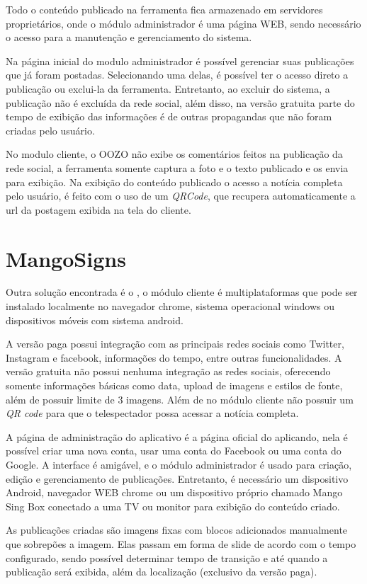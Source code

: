 Todo o conteúdo publicado na ferramenta fica armazenado em servidores proprietários, onde o módulo administrador é uma página WEB, sendo necessário o acesso para a manutenção e gerenciamento do sistema. 

Na página inicial do modulo administrador é possível gerenciar suas publicações que já foram postadas. Selecionando uma delas, é possível ter o acesso direto a publicação ou exclui-la da ferramenta. Entretanto, ao excluir do sistema, a publicação não é excluída da rede social, além disso, na versão gratuita parte do tempo de exibição das informações é de outras propagandas que não foram criadas pelo usuário. 

No modulo cliente, o OOZO não exibe os comentários feitos na publicação da rede social, a ferramenta somente captura a foto e o texto publicado e os envia para exibição. Na exibição do conteúdo publicado o acesso a notícia completa pelo usuário, é feito com o uso de um \textit{QRCode}, que recupera automaticamente a url da postagem exibida na tela do cliente.

\section{MangoSigns}
\label{sec:mango}
Outra solução encontrada é o \cite{mango2017}, o módulo cliente é multiplataformas que pode ser instalado localmente no navegador chrome, sistema operacional windows ou dispositivos móveis com sistema android.

A versão paga possui integração com as principais redes sociais como Twitter, Instagram e facebook, informações do tempo, entre outras funcionalidades. A versão gratuita não possui nenhuma integração as redes sociais, oferecendo somente informações básicas como data, upload de imagens e estilos de fonte, além de possuir limite de 3 imagens. Além de no módulo cliente não possuir um \textit{QR code} para que o telespectador possa acessar a notícia completa.

A página de administração do aplicativo é a página oficial do aplicando, nela é possível criar uma nova conta, usar uma conta do Facebook ou uma conta do Google. A interface é amigável, e o módulo administrador é usado para criação, edição e gerenciamento de publicações. Entretanto, é necessário um dispositivo Android, navegador WEB chrome ou um dispositivo próprio chamado Mango Sing Box conectado a uma TV ou monitor para exibição do conteúdo criado.

As publicações criadas são imagens fixas com blocos adicionados manualmente que sobrepões a imagem. Elas passam em forma de slide de acordo com o tempo configurado, sendo possível determinar tempo de transição e até quando a publicação será exibida, além da localização (exclusivo da versão paga). 


